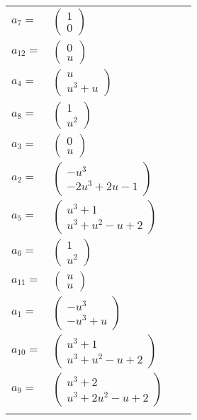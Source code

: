 \documentclass[1p]{elsarticle_modified}
\theoremstyle{definition}
\begin{document}
\begin{tabular}{m{7pt} m{180pt} m{7pt} m{180pt} }
\flushright $a_{7}=$&$\begin{pmatrix}1\\0\end{pmatrix}$ \\
\flushright $a_{12}=$&$\begin{pmatrix}0\\u\end{pmatrix}$ \\
\flushright $a_{4}=$&$\begin{pmatrix}u\\u^3+u\end{pmatrix}$ \\
\flushright $a_{8}=$&$\begin{pmatrix}1\\u^2\end{pmatrix}$ \\
\flushright $a_{3}=$&$\begin{pmatrix}0\\u\end{pmatrix}$ \\
\flushright $a_{2}=$&$\begin{pmatrix}- u^3\\-2 u^3+2 u-1\end{pmatrix}$ \\
\flushright $a_{5}=$&$\begin{pmatrix}u^3+1\\u^3+u^2- u+2\end{pmatrix}$ \\
\flushright $a_{6}=$&$\begin{pmatrix}1\\u^2\end{pmatrix}$ \\
\flushright $a_{11}=$&$\begin{pmatrix}u\\u\end{pmatrix}$ \\
\flushright $a_{1}=$&$\begin{pmatrix}- u^3\\- u^3+u\end{pmatrix}$ \\
\flushright $a_{10}=$&$\begin{pmatrix}u^3+1\\u^3+u^2- u+2\end{pmatrix}$ \\
\flushright $a_{9}=$&$\begin{pmatrix}u^3+2\\u^3+2 u^2- u+2\end{pmatrix}$\\&\end{tabular}
\end{document}
